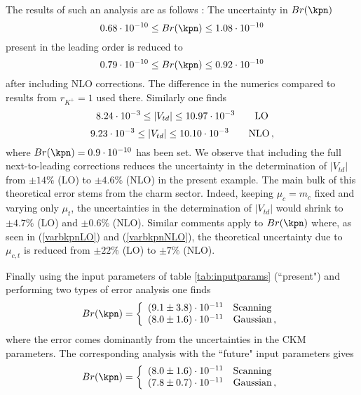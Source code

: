 The results of such an analysis are as follows \cite{BBL}:
The uncertainty in $Br(\kpn)$
\begin{equation}\label{varbkpnLO}
0.68\cdot 10^{-10}\leq Br(\kpn)\leq 1.08\cdot 10^{-10}
\end{equation}
present in the leading order is reduced to
\begin{equation}\label{varbkpnNLO}
0.79\cdot 10^{-10}\leq Br(\kpn)\leq 0.92\cdot 10^{-10}
\end{equation}
after including NLO corrections. 
The difference in the numerics compared to \cite{BBL} results
from $r_{K^+}=1$ used there.
Similarly one finds
\begin{equation}\label{varvtdLO}
8.24\cdot 10^{-3}\leq |V_{td}|\leq 10.97\cdot 10^{-3} \qquad {\rm LO}
\end{equation}
\begin{equation}\label{varvtdNLO}
9.23\cdot 10^{-3}\leq |V_{td}|\leq 10.10\cdot 10^{-3}  \qquad {\rm NLO}\,,
\end{equation}
where $Br(\kpn)=0.9\cdot 10^{-10}$ has been set. We observe that including
the full next-to-leading corrections reduces the uncertainty in the
determination of $|V_{td}|$ from $\pm 14\%$ (LO) to $\pm 4.6\%$ (NLO)
in the present example. The main bulk of this theoretical error stems
from the charm sector. Indeed, keeping $\mu_c=m_c$ fixed and varying
only $\mu_t$, the uncertainties in the determination of $|V_{td}|$
would shrink to $\pm 4.7\%$ (LO) and $\pm 0.6\%$ (NLO).
Similar comments apply to $Br(\kpn)$ where, as seen in
(\ref{varbkpnLO}) and (\ref{varbkpnNLO}), the theoretical uncertainty
due to $\mu_{c,t}$ is reduced from $\pm 22\%$ (LO) to $\pm 7\%$ (NLO).

Finally using the input parameters of table \ref{tab:inputparams}
(``present") and performing two
types of error analysis one finds \cite{BJL96b}
\begin{equation}\label{kpnr}
Br(\kpn)=\left\{ \begin{array}{ll}
(9.1 \pm 3.8)\cdot 10^{-11} & {\rm Scanning} \\
(8.0 \pm 1.6) \cdot 10^{-11} & {\rm Gaussian}\,, \end{array} \right.
\end{equation}
where the error comes dominantly from the uncertainties in the CKM
parameters.
The corresponding analysis with the ``future" input parameters gives
\begin{equation}\label{kpnr0}
Br(\kpn)=\left\{ \begin{array}{ll}
(8.0 \pm 1.6)\cdot 10^{-11} & {\rm Scanning} \\
(7.8 \pm 0.7) \cdot 10^{-11} & {\rm Gaussian}\,, \end{array} \right.
\end{equation}
 
